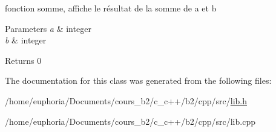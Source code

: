 fonction somme, affiche le résultat de la somme de a et b 


\begin{DoxyParams}{Parameters}
{\em a} & integer \\
\hline
{\em b} & integer \\
\hline
\end{DoxyParams}
\begin{DoxyReturn}{Returns}
0 
\end{DoxyReturn}


The documentation for this class was generated from the following files\+:\begin{DoxyCompactItemize}
\item 
/home/euphoria/\+Documents/cours\+\_\+b2/c\+\_\+c++/b2/cpp/src/\hyperlink{lib_8h}{lib.\+h}\item 
/home/euphoria/\+Documents/cours\+\_\+b2/c\+\_\+c++/b2/cpp/src/lib.\+cpp\end{DoxyCompactItemize}

